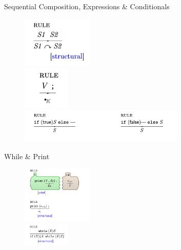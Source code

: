 \documentclass{beamer}
\begin{document}
\begin{frame}{Sequential Composition, Expressions \& Conditionals}
    \begin{figure}[H]
        \centering
    \includegraphics[width=0.3\textwidth]{seqcomp} \\
    \includegraphics[width=0.2\textwidth]{expr} \\
    \includegraphics[width=0.7\textwidth]{cond}
    \end{figure}
\end{frame}
\begin{frame}{While \& Print}
    \begin{figure}[H]
        \centering
    \includegraphics[width=0.3\textwidth]{while} \\
    \includegraphics[width=0.2\textwidth]{print} \\
    \end{figure}
\end{frame}
\end{document}
